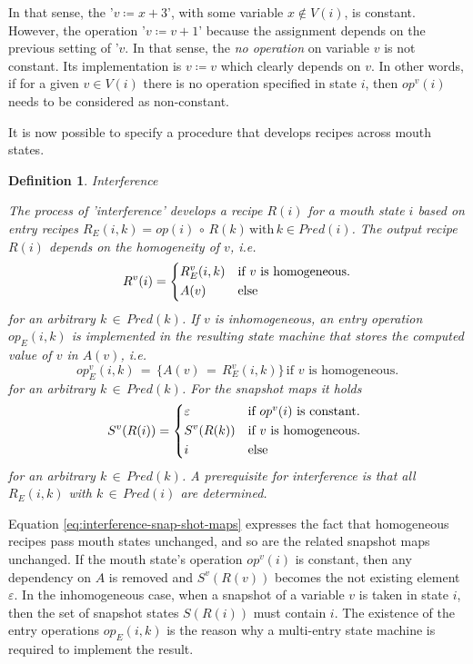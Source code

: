 \documentclass[12pt,a4paper]{scrartcl}
\newtheorem{definition}{Definition}
\begin{document}
In that sense, the '$v\coloneqq x+3$', with some variable $x\notin V(i)$, is constant.
However, the operation '$v\coloneqq v+1$' because the assignment depends on the previous
setting of '$v$. In that sense, the \textit{no operation} on variable $v$ is not 
constant. Its implementation is $v\coloneqq v$ which clearly depends on $v$. In other words,
if for a given $v\in V(i)$ there is no operation specified in state $i$, then 
$op^v(i)$ needs to be considered as non-constant.

It is now possible to specify a procedure that develops recipes across mouth
states. 
\begin{definition} Interference

The process of 'interference' develops a recipe $R(i)$ for a mouth state $i$
based on entry recipes $R_E(i,k) = op(i)\,\circ\,R(k)\,\mbox{with}\,k \in Pred(i)$.
The output recipe $R(i)$ depends on the homogeneity of $v$, i.e. 
\begin{equation}
    R^v(i) = \begin{dcases*}
              R_E^v(i,k) & if $v$ is homogeneous.\\
              A(v)       & else
             \end{dcases*}
\end{equation}
for an arbitrary $k\,\in\,Pred(k)$. If $v$ is inhomogeneous, an entry
operation $op_E(i,k)$ is implemented in the resulting state machine that
stores the computed value of $v$ in $A(v)$, i.e.
\begin{equation}
    op_E^v(i,k) \,=\, \{ A(v) \,=\, R^v_E(i,k) \} \,\mbox{if $v$ is homogeneous}.
\end{equation}
for an arbitrary $k\,\in\,Pred(k)$. For the snapshot maps it holds
\begin{equation} \label{eq:interference-snap-shot-maps}
    S^v(R(i)) = \begin{dcases*}
                  \varepsilon & if $op^v(i)$ is constant. \\
                  S^v(R(k))   & if $v$ is homogeneous.\\
                  i           & else
                \end{dcases*}
\end{equation}
for an arbitrary $k\,\in\,Pred(k)$. A prerequisite for interference is that 
all $R_E(i,k)$ with $k\,\in\,Pred(i)$ are determined.
\end{definition}
Equation \eqref{eq:interference-snap-shot-maps} expresses the fact that
homogeneous recipes pass mouth states unchanged, and so are the related
snapshot maps unchanged. If the mouth state's operation $op^v(i)$ is 
constant, then any dependency on $A$ is removed and $S^v(R(v))$ becomes
the not existing element $\varepsilon$. In the inhomogeneous case, when a snapshot of a
variable $v$ is taken in state $i$, then the set of snapshot states $S(R(i))$
must contain $i$. The existence of the entry operations $op_E(i,k)$ is the
reason why a multi-entry state machine is required to implement the result. 
\end{document}

